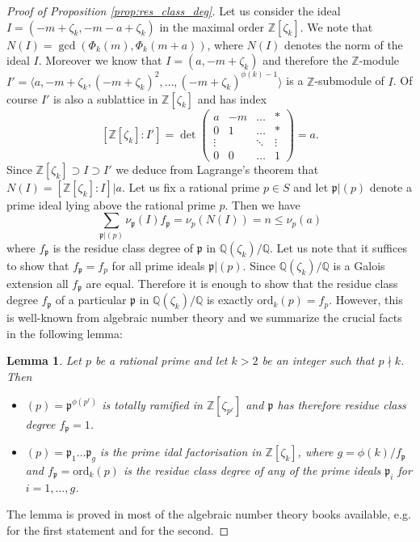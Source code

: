 \documentclass{amsart}
\theoremstyle{plain}
\numberwithin{equation}{section}
\newtheorem{lemma}[thm]{Lemma}
\theoremstyle{remark}
\begin{document}
\begin{proof}[Proof of Proposition \ref{prop:res_class_deg}]
  Let us consider the ideal $I=(-m+\zeta_k,-m-a+\zeta_k)$ in the
  maximal order ${{\mathbb Z}}[\zeta_k]$. We note that
  $N(I)=\gcd(\Phi_k(m),\Phi_k(m+a))$, where $N(I)$ denotes the norm
of the ideal $I$. Moreover we know that
  $I=(a,-m+\zeta_k)$ and therefore the ${{\mathbb Z}}$-module $I'=\langle a,
  -m+\zeta_k, (-m+\zeta_k)^2, \dots, (-m+\zeta_k)^{\phi(k)-1}\rangle$ is
  a ${{\mathbb Z}}$-submodule of $I$. Of course $I'$ is also a sublattice in
  ${{\mathbb Z}}[\zeta_k]$ and has index
$$[{{\mathbb Z}}[\zeta_k]:I']=\det\left(\begin{array}{cccc} a & -m & \dots & *\\ 0 & 1 & \dots & * \\ \vdots & & \ddots & \vdots \\ 0& 0 & \dots & 1\end{array}\right)=a.$$
Since ${{\mathbb Z}}[\zeta_k]\supset I \supset I'$ we deduce from Lagrange's
theorem that $N(I)=[{{\mathbb Z}}[\zeta_k]:I]|a$. Let us fix a rational prime $p\in S$ and let
$\mathfrak p|(p)$ denote a prime ideal lying above the rational prime
$p$. Then we have
$$ \sum_{\mathfrak p|(p)} \nu_{\mathfrak p}(I)f_{\mathfrak p}=\nu_p(N(I))=n\leq \nu_p(a)$$
where $f_{\mathfrak p}$ is the residue class degree of $\mathfrak p$
in ${{\mathbb Q}}(\zeta_k)/{{\mathbb Q}}$. Let us note that it suffices to show that
$f_{\mathfrak p}=f_p$ for all prime ideals $\mathfrak p|(p)$. Since
${{\mathbb Q}}(\zeta_k)/{{\mathbb Q}}$ is a Galois extension all $f_{\mathfrak p}$ are
equal. Therefore it is enough to show that the residue class degree $f_{{\mathfrak p}}$ of a
particular $\mathfrak p$ in ${{\mathbb Q}}(\zeta_k)/{{\mathbb Q}}$ is exactly ${\mathrm{ord}}_k(p)=f_p$. However, this is well-known
from algebraic number theory and we summarize the crucial facts in the following lemma:

\begin{lemma}\label{lem:alg_nt}
 Let $p$ be a rational prime and let $k>2$ be an integer such that $p\nmid k$. Then
 \begin{itemize}
  \item $(p)={{\mathfrak p}}^{\phi(p^\ell)}$ is totally ramified in ${{\mathbb Z}}[\zeta_{p^\ell}]$ and ${{\mathfrak p}}$ has therefore residue class degree $f_{{\mathfrak p}}=1$.
  \item $(p)={{\mathfrak p}}_1 \dots {{\mathfrak p}}_g$ is the prime idal factorisation in ${{\mathbb Z}}[\zeta_k]$, where $g=\phi(k)/f_{{\mathfrak p}}$ and $f_{{\mathfrak p}}={\mathrm{ord}}_{k}(p)$ is the residue class degree of 
any of the prime ideals ${{\mathfrak p}}_i$ for $i=1,\dots,g$.
 \end{itemize}
\end{lemma}

 The lemma is proved in most of the algebraic number theory books available, e.g. \cite[Chapter~11.3, Lemma N]{Ribenboim:ANT} for the first statement and
 \cite[Theorem 2.13]{Washington:CF} for the second.\end{proof}
\end{document}
